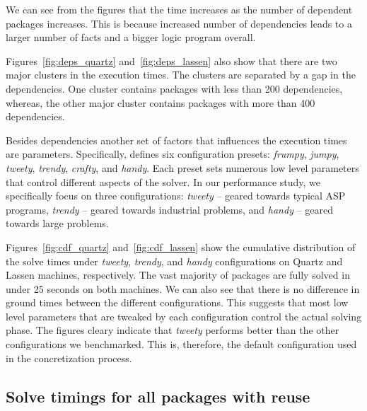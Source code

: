 We can see from the figures that the time increases as the number of dependent packages increases. This is because increased number of dependencies leads to a larger number of facts and a bigger logic program overall.

Figures~\ref{fig:deps_quartz} and~\ref{fig:deps_lassen} also show that there are two major clusters in the execution times. The clusters are separated by a gap in the dependencies. One cluster contains packages with less than 200 dependencies, whereas, the other major cluster contains packages with more than 400 dependencies. 


Besides dependencies another set of factors that influences the execution times are \clingo{} parameters. Specifically, \clingo{} defines six configuration presets: \emph{frumpy}, \emph{jumpy}, \emph{tweety}, \emph{trendy}, \emph{crafty}, and \emph{handy}. Each preset sets numerous low level parameters that control different aspects of the solver. In our performance study, we specifically focus on three configurations: \emph{tweety} -- geared towards typical ASP programs, \emph{trendy} -- geared towards industrial problems, and \emph{handy} -- geared towards large problems.





Figures~\ref{fig:cdf_quartz} and~\ref{fig:cdf_lassen} show the cumulative distribution of the solve times under \emph{tweety}, \emph{trendy}, and \emph{handy} configurations on Quartz and Lassen machines, respectively. The vast majority of packages are fully solved in under 25 seconds on both machines. We can also see that there is no difference in ground times between the different configurations. This suggests that most low level parameters that are tweaked by each configuration control the actual solving phase. The figures cleary indicate that \emph{tweety} performs better than the other configurations we benchmarked. This is, therefore, the default configuration used in the concretization process. 


\subsection{Solve timings for all packages with reuse}

